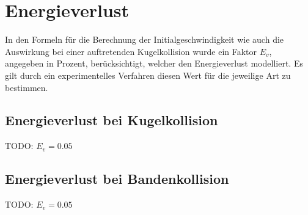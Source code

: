 \section{Energieverlust}
In den Formeln für die Berechnung der Initialgeschwindigkeit wie auch die Auswirkung bei einer auftretenden Kugelkollision
wurde ein Faktor $E_v$, angegeben in Prozent, berücksichtigt, welcher den Energieverlust modelliert.
Es gilt durch ein experimentelles Verfahren diesen Wert für die jeweilige Art zu bestimmen.

\subsection{Energieverlust bei Kugelkollision}
TODO: $E_v = 0.05$

\subsection{Energieverlust bei Bandenkollision}
TODO: $E_v = 0.05$
